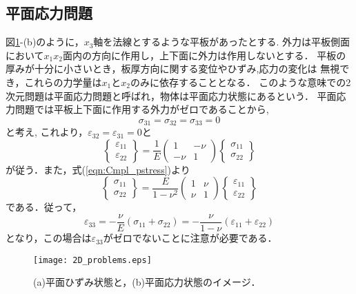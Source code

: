 \documentclass[10pt,a4j]{jarticle}
\begin{document}
\subsection{平面応力問題}
図\ref{fig:fig6_2}-(b)のように，$x_3$軸を法線とするような平板があったとする.
外力は平板側面において$x_1x_2$面内の方向に作用し，上下面に外力は作用しないとする．
平板の厚みが十分に小さいとき，板厚方向に関する変位やひずみ,応力の変化は
無視でき，これらの力学量は$x_1$と$x_2$のみに依存することとなる．
このような意味での2次元問題は平面応力問題と呼ばれ，物体は平面応力状態にあるという．
平面応力問題では平板上下面に作用する外力がゼロであることから, 
\begin{equation}
 \sigma_{31}=\sigma_{32}=\sigma_{33}=0
\end{equation}
と考え, これより，$\varepsilon_{32}=\varepsilon_{31}=0$と
\begin{equation}
	\left\{ 
	\begin{array}{*{20}{c}}
	\varepsilon _{11}\\
	\varepsilon _{22}
	\end{array}
	\right\} 
	= 
	\frac{1}{E}\left( 
	\begin{array}{*{20}{c}}
	1& - \nu \\
	 - \nu &1
	\end{array}
	\right)
	\left\{ 
	\begin{array}{*{20}{c}}
	\sigma _{11}\\
	\sigma _{22}
	\end{array} 
	\right\}
	\label{eqn:Cmpl_pstress}
\end{equation}
が従う．また，式(\ref{eqn:Cmpl_pstress})より
\begin{equation}
	\left\{ 
	\begin{array}{*{20}{c}}
	\sigma _{11}\\
	\sigma _{22}
	\end{array}
	\right\} 
	= 
	\frac{E}{1-\nu^2}\left( 
	\begin{array}{*{20}{c}}
	1&  \nu \\
	  \nu &1
	\end{array}
	\right)
	\left\{ 
	\begin{array}{*{20}{c}}
	\varepsilon _{11}\\
	\varepsilon _{22}
	\end{array} 
	\right\}
	\label{eqn:Hooke_pstress}
\end{equation}
である．従って，
\begin{equation}
	\varepsilon_{33}=-\frac{\nu}{E} \left( \sigma_{11}+\sigma_{22} \right)
	= -\frac{\nu}{1-\nu}\left(\varepsilon_{11}+\varepsilon_{22}\right)
\end{equation}
となり，この場合は$\varepsilon_{33}$がゼロでないことに注意が必要である．
\begin{figure}[h]
	\begin{center}
	\texttt{[image: 2D\_problems.eps]} 
	\end{center}
	\caption{
	(a)平面ひずみ状態と，(b)平面応力状態のイメージ．
	 } 
	\label{fig:fig6_2}
\end{figure}
\end{document}
